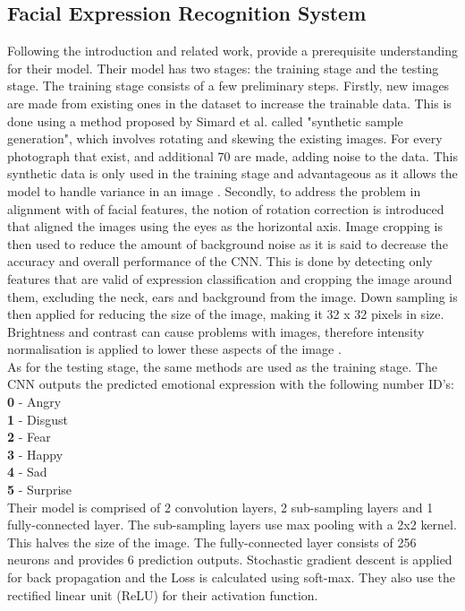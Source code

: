 \subsection{Facial Expression Recognition System}
Following the introduction and related work, \citeauthor{LOPES} provide a prerequisite understanding for their model. Their model has two stages: the training stage and the testing stage. The training stage consists of a few preliminary steps. Firstly, new images are made from existing ones in the dataset to increase the trainable data. This is done using a method proposed by Simard et al. called "synthetic sample generation", which involves rotating and skewing the existing images. For every photograph that exist, and additional 70 are made, adding noise to the data. This synthetic data is only used in the training stage and advantageous as it allows the model to handle variance in an image \citep{LOPES}. Secondly, to address the problem in alignment with of facial features, the notion of rotation correction is introduced that aligned the images using the eyes as the horizontal axis. Image cropping is then used to reduce the amount of background noise as it is said to decrease the accuracy and overall performance of the CNN. This is done by detecting only features that are valid of expression classification and cropping the image around them, excluding the neck, ears and background from the image.
Down sampling is then applied for reducing the size of the image, making it 32 x 32 pixels in size. Brightness and contrast can cause problems with images, therefore intensity normalisation is applied to lower these aspects of the image \citep{LOPES}. \\
As for the testing stage, the same methods are used as the training stage. The CNN outputs the predicted emotional expression with the following number ID's:\\
\textbf{0} - Angry\\
\textbf{1} - Disgust\\
\textbf{2} - Fear\\
\textbf{3} - Happy\\
\textbf{4} - Sad\\
\textbf{5} - Surprise\\

Their model is comprised of 2 convolution layers, 2 sub-sampling layers and 1 fully-connected layer. The sub-sampling layers use max pooling with a 2x2 kernel. This halves the size of the image. The fully-connected layer consists of 256 neurons and provides 6 prediction outputs. Stochastic gradient descent is applied for back propagation and the Loss is calculated using soft-max. They also use the rectified linear unit (ReLU) for their activation function.

